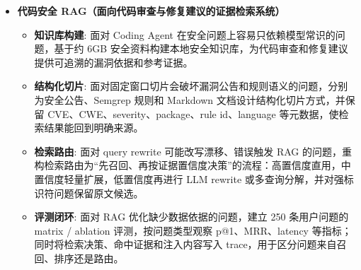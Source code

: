 \documentclass[zh]{resume}
\begin{document}
\begin{itemize}
\item \textbf{代码安全 RAG（面向代码审查与修复建议的证据检索系统）}
\begin{itemize}
    \item \textbf{知识库构建}: 面对 Coding Agent 在安全问题上容易只依赖模型常识的问题，基于约 6GB 安全资料构建本地安全知识库，为代码审查和修复建议提供可追溯的漏洞依据和参考证据。
    \item \textbf{结构化切片}: 面对固定窗口切片会破坏漏洞公告和规则语义的问题，分别为安全公告、Semgrep 规则和 Markdown 文档设计结构化切片方式，并保留 CVE、CWE、severity、package、rule id、language 等元数据，使检索结果能回到明确来源。
    \item \textbf{检索路由}: 面对 query rewrite 可能改写漂移、错误触发 RAG 的问题，重构检索路由为“先召回、再按证据置信度决策”的流程：高置信度直用，中置信度轻量扩展，低置信度再进行 LLM rewrite 或多查询分解，并对强标识符问题保留原文候选。
    \item \textbf{评测闭环}: 面对 RAG 优化缺少数据依据的问题，建立 250 条用户问题的 matrix / ablation 评测，按问题类型观察 p@1、MRR、latency 等指标；同时将检索决策、命中证据和注入内容写入 trace，用于区分问题来自召回、排序还是路由。
\end{itemize}

\end{itemize}
\end{document}
